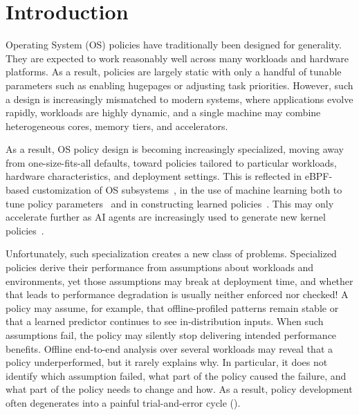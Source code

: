 \section{Introduction}\label{sec:introduction}

Operating System (OS) policies have traditionally been designed for generality. They are expected to work reasonably well across many workloads and hardware platforms.
As a result, policies are largely static with only a handful of tunable parameters such as enabling hugepages or adjusting task priorities. 
However, such a design is increasingly mismatched to modern systems, where applications evolve rapidly, workloads are highly dynamic, and a single machine may combine heterogeneous cores, memory tiers, and accelerators.

As a result, OS policy design is becoming increasingly specialized, moving away from one-size-fits-all defaults, toward policies tailored to particular workloads, hardware characteristics, and deployment settings.
This is reflected in eBPF-based customization of OS subsystems~\cite{kflex-sosp24,cache-ext-sosp25,sched-ext,meta-lavd}, in the use of machine learning both to tune policy parameters~\cite{tuning-pacmi25,agentic-tuning-ml4sys25} and in constructing learned policies~\cite{heimdall-eurosys25,orca-sigcomm20,kml-tos23,kleio-hpdc19}.
This may only accelerate further as AI agents are increasingly used to generate new kernel policies~\cite{policysmith-hotnets25,glia-arxiv25,barbarians25,vulcan-arxiv25,agentic-os-ml4sys25}.

Unfortunately, such specialization creates a new class of problems. Specialized policies derive their performance from assumptions about workloads and environments, yet those assumptions may break at deployment time, and whether that leads to performance degradation is usually neither enforced nor checked! A policy may assume, for example, that offline-profiled patterns remain stable or that a learned predictor continues to see in-distribution inputs. When such assumptions fail, the policy may silently stop delivering intended performance benefits. 
Offline end-to-end analysis over several workloads may reveal that a policy underperformed, but it rarely explains why. In particular, it does not identify which assumption failed, what part of the policy caused the failure, and what part of the policy needs to change and how. As a result, policy development often degenerates into a painful trial-and-error cycle ().

